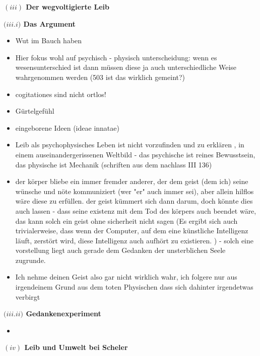 \documentclass[a4paper, 12pt]{article}
\begin{document}
\begin{onehalfspace}
\vspace{5mm}
\noindent\textbf{$(iii)$ Der wegvoltigierte Leib}

\vspace{3mm}
\noindent\textbf{$(iii.$\footnotesize$i$\normalsize$)$ Das Argument}

\begin{itemize}
  \item Wut im Bauch haben
  \item Hier fokus wohl auf psychisch - physisch unterscheidung: wenn es wesensunterschied ist dann müssen diese ja auch unterschiedliche Weise wahrgenommen werden (503 ist das wirklich gemeint?)
  \item cogitationes sind nicht ortlos!
  \item Gürtelgefühl
  \item eingeborene Ideen (ideae innatae)
  \item Leib als psychophysisches Leben ist nicht vorzufinden und zu erklären , in einem auseinandergerissenen Weltbild - das psychische ist reines Bewusstsein, das physische ist Mechanik (schriften aus dem nachlass III 136)
  \item der körper bliebe ein immer fremder anderer, der dem geist (dem ich) seine wünsche und nöte kommuniziert (wer "er" auch immer sei), aber allein hilflos wäre diese zu erfüllen. der geist kümmert sich dann darum, doch könnte dies auch lassen - dass seine existenz mit dem Tod des körpers auch beendet wäre, das kann solch ein geist ohne sicherheit nicht sagen (Es ergibt sich auch trivialerweise, dass wenn der Computer, auf dem eine künstliche Intelligenz läuft, zerstört wird, diese Intelligenz auch aufhört zu existieren. ) - solch eine vorstellung liegt auch gerade dem Gedanken der unsterblichen Seele zugrunde. 
  \item Ich nehme deinen Geist also gar nicht wirklich wahr, ich folgere nur aus irgendeinem Grund aus dem toten Physischen dass sich dahinter irgendetwas verbirgt
\end{itemize}

\vspace{3mm}
\noindent\textbf{$(iii.$\footnotesize$ii$\normalsize$)$ Gedankenexperiment}

\begin{itemize}
  \item 
\end{itemize}


\vspace{5mm}
\noindent\textbf{$(iv)$ Leib und Umwelt bei Scheler}


\end{onehalfspace}
\end{document}
